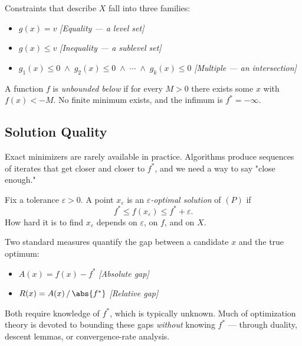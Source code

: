 \begin{defn}
  Constraints that describe $X$ fall into three families:
  \begin{itemize}
    \item $g(x) = v$ \hfill\textit{[Equality — a level set]}
    \item $g(x) \leq v$ \hfill\textit{[Inequality — a sublevel set]}
    \item $g_1(x) \leq 0 \;\land\; g_2(x) \leq 0 \;\land\; \cdots \;\land\; g_k(x) \leq 0$
      \hfill\textit{[Multiple — an intersection]}
  \end{itemize}
\end{defn}

\begin{defn}
  A function $f$ is \textit{unbounded below} if for every $M > 0$ there exists some $x$ with $f(x) < -M$.
  No finite minimum exists, and the infimum is $f^* = -\infty$.
\end{defn}


\subsection{Solution Quality}

Exact minimizers are rarely available in practice.
Algorithms produce sequences of iterates that get closer and closer to $f^*$, and we need a way to say "close enough."

\begin{defn}
  Fix a tolerance $\varepsilon > 0$.
  A point $x_\varepsilon$ is an \textit{$\varepsilon$-optimal solution} of $(P)$ if
  $$
    f^* \leq f(x_\varepsilon) \leq f^* + \varepsilon.
  $$
  How hard it is to find $x_\varepsilon$ depends on $\varepsilon$, on $f$, and on $X$.
\end{defn}

Two standard measures quantify the gap between a candidate $x$ and the true optimum:
\begin{itemize}
  \item $A(x) = f(x) - f^*$
    \hfill\textit{[Absolute gap]}
  \item $R(x) = A(x) \,/\, \abs{f^*}$
    \hfill\textit{[Relative gap]}
\end{itemize}
Both require knowledge of $f^*$, which is typically unknown.
Much of optimization theory is devoted to bounding these gaps \emph{without} knowing $f^*$ — through duality, descent lemmas, or convergence-rate analysis.


